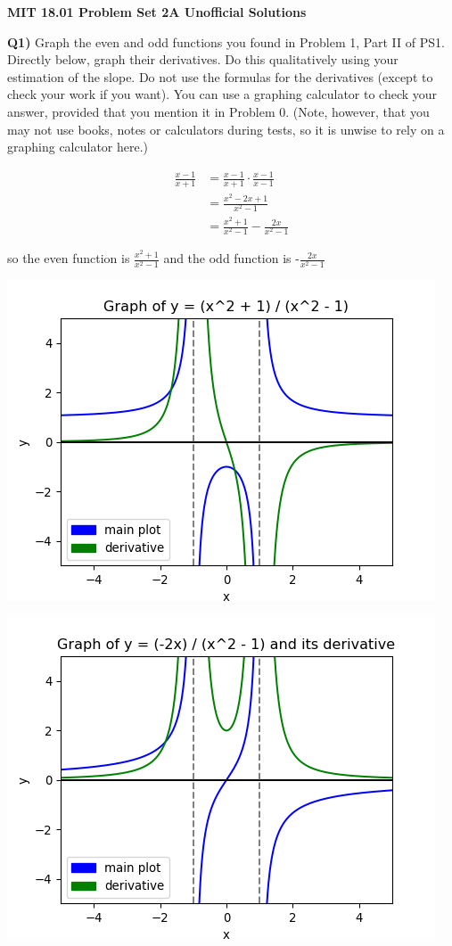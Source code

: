 \documentclass[9pt]{article}
\begin{document}
\begin{center}
  \large\textbf{MIT 18.01 Problem Set 2A Unofficial Solutions}
\end{center}

\begin{tcolorbox}
  \textbf{Q1)} Graph the even and odd functions you found in Problem 1, Part II of PS1. Directly below, graph their derivatives. Do this qualitatively using your estimation of the slope. Do not use the formulas for the derivatives (except to check your work if you want). You can use a graphing calculator to check your answer, provided that you mention it in Problem 0. (Note, however, that you may not use books, notes or calculators during tests, so it is unwise to rely on a graphing calculator here.)
\end{tcolorbox}

\begin{align*}
  \frac{x - 1}{x + 1} &= \frac{x - 1}{x + 1} \cdot \frac{x - 1}{x - 1}\\
                      &= \frac{x^2 - 2x + 1}{x^2 - 1}\\
                      &= \frac{x^2 + 1}{x^2 - 1} - \frac{2x}{x^2 - 1}
\end{align*}

so the even function is $\frac{x^2 + 1}{x^2 - 1}$ and the odd function is -$\frac{2x}{x^2 - 1}$

\begin{center}
  \includegraphics[scale=0.8]{q1_even.png}
\end{center}

\begin{center}
  \includegraphics[scale=0.8]{q1_odd.png}
\end{center}
\end{document}
